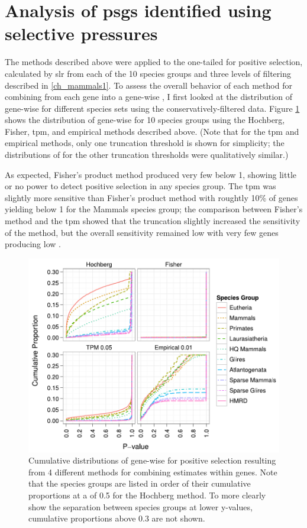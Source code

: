 \section{Analysis of \acp{psg} identified using \sw selective pressures}

The methods described above were applied to the one-tailed \sw \pvs
for positive selection, calculated by \ac{slr} from each of the 10
species groups and three levels of \sw filtering described in
\ref{ch_mammals1}. To assess the overall behavior of each method for
combining \sw \pvs from each gene into a gene-wise \pv, I first looked
at the distribution of gene-wise \pvs for different species sets using
the conservatively-filtered \sw data. Figure \ref{fig_psg_pvals} shows
the distribution of gene-wise \pvs for 10 species groups using the
Hochberg, Fisher, \ac{tpm}, and empirical methods described
above. (Note that for the \ac{tpm} and empirical methods, only one
truncation threshold is shown for simplicity; the distributions of
\pvs for the other truncation thresholds were qualitatively similar.)

As expected, Fisher's product method produced very few \pvs below 1,
showing little or no power to detect positive selection in any species
group. The \ac{tpm} was slightly more sensitive than Fisher's product
method with roughtly 10\% of genes yielding \pvs below 1 for the
Mammals species group; the comparison between Fisher's method and the
\ac{tpm} showed that the truncation slightly increased the sensitivity
of the method, but the overall sensitivity remained low with very few
genes producing low \pvs.

\begin{figure}
\centering
\includegraphics[scale=0.9]{Figs/psg_pvals.pdf}
\caption{Cumulative distributions of gene-wise \pvs for positive
  selection resulting from 4 different methods for combining \sw
  estimates within genes. Note that the species groups are listed in
  order of their cumulative proportions at a \pv of 0.5 for the
  Hochberg method. To more clearly show the separation between species
  groups at lower y-values, cumulative proportions above 0.3 are not
  shown.}
\label{fig_psg_pvals}
\end{figure}

